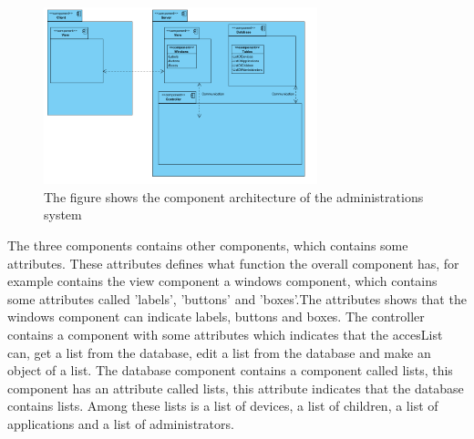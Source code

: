 \begin{figure}[!h]
\centering
\includegraphics[width=300px]{img/ComponentArketektur.png}
\caption{The figure shows the component architecture of the administrations system}
\label{fig:architecture}
\end{figure}

The three components contains other components, which contains some attributes. These attributes defines what function the overall component has, for example contains the view component a windows component, which contains some attributes called 'labels', 'buttons' and 'boxes'.The attributes shows that the windows component can indicate labels, buttons and boxes.
The controller contains a component with some attributes which indicates that the accesList can, get a list from the database, edit a list from the database and make an object of a list.
The database component contains a component called lists, this component has an attribute called lists, this attribute indicates that the database contains lists. Among these lists is a list of devices, a list of children, a list of applications and a list of administrators.